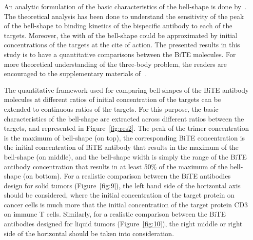 An analytic formulation of the basic characteristics of the bell-shape is done by~\cite{douglass2013comprehensive}. The theoretical analysis has been done to understand the sensitivity of the peak of the bell-shape to binding kinetics of the bispecific antibody to each of the targets. Moreover, the with of the bell-shape could be approximated by initial concentrations of the targets at the cite of action. The presented results in this study is to have a quantitative comparisons between the \ac{BiTE} molecules. For more theoretical understanding of the three-body problem, the readers are encouraged to the supplementary materials of~\cite{douglass2013comprehensive}.

The quantitative framework used for comparing bell-shapes of the \ac{BiTE} antibody molecules at different ratios of initial concentration of the targets can be extended to continuous ratios of the targets. For this purpose, the basic characteristics of the bell-shape are extracted across different ratios between the targets, and represented in Figure~\ref{fig:res2}. The peak of the trimer concentration is the maximum of bell-shape (on top), the corresponding \ac{BiTE} concentration is the initial concentration of \ac{BiTE} antibody that results in the maximum of the bell-shape (on middle), and the bell-shape width is simply the range of the \ac{BiTE} antibody concentration that results in at least 50\% of the maximum of the bell-shape (on bottom). For a realistic comparison between the \ac{BiTE} antibodies design for solid tumors (Figure~\ref{fig:9}), the left hand side of the horizontal axis should be considered, where the initial concentration of the target protein on cancer cells is much more that the initial concentration of the target protein CD3 on immune T cells. Similarly, for a realistic comparison between the \ac{BiTE} antibodies designed for liquid tumors (Figure~\ref{fig:10}), the right middle or right side of the horizontal should be taken into consideration.

